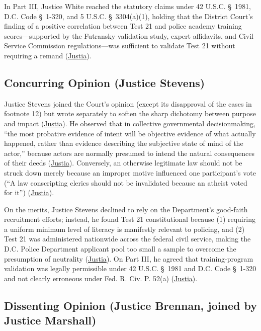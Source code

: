 \documentclass[12pt]{article}
\begin{document}
In Part III, Justice White reached the statutory claims under 42 U.S.C. \S~1981, D.C. Code \S~1-320, and 5 U.S.C. \S~3304(a)(1), holding that the District Court's finding of a positive correlation between Test 21 and police academy training scores---supported by the Futransky validation study, expert affidavits, and Civil Service Commission regulations---was sufficient to validate Test 21 without requiring a remand (\href{https://supreme.justia.com/cases/federal/us/426/229/}{Justia}).

\subsection{Concurring Opinion (Justice Stevens)}

Justice Stevens joined the Court's opinion (except its disapproval of the cases in footnote 12) but wrote separately to soften the sharp dichotomy between purpose and impact (\href{https://supreme.justia.com/cases/federal/us/426/229/}{Justia}). He observed that in collective governmental decisionmaking, ``the most probative evidence of intent will be objective evidence of what actually happened, rather than evidence describing the subjective state of mind of the actor,'' because actors are normally presumed to intend the natural consequences of their deeds (\href{https://supreme.justia.com/cases/federal/us/426/229/}{Justia}). Conversely, an otherwise legitimate law should not be struck down merely because an improper motive influenced one participant's vote (``A law conscripting clerics should not be invalidated because an atheist voted for it'') (\href{https://supreme.justia.com/cases/federal/us/426/229/}{Justia}).

On the merits, Justice Stevens declined to rely on the Department's good-faith recruitment efforts; instead, he found Test 21 constitutional because (1) requiring a uniform minimum level of literacy is manifestly relevant to policing, and (2) Test 21 was administered nationwide across the federal civil service, making the D.C. Police Department applicant pool too small a sample to overcome the presumption of neutrality (\href{https://supreme.justia.com/cases/federal/us/426/229/}{Justia}). On Part III, he agreed that training-program validation was legally permissible under 42 U.S.C. \S~1981 and D.C. Code \S~1-320 and not clearly erroneous under Fed. R. Civ. P. 52(a) (\href{https://supreme.justia.com/cases/federal/us/426/229/}{Justia}).

\subsection{Dissenting Opinion (Justice Brennan, joined by Justice Marshall)}
\end{document}
